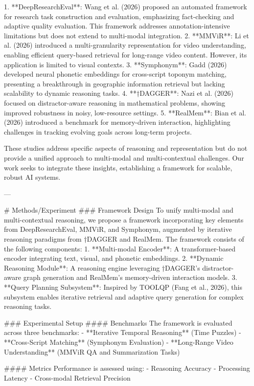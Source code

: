 1. **DeepResearchEval**: Wang et al. (2026) proposed an automated framework for research task construction and evaluation, emphasizing fact-checking and adaptive quality evaluation. This framework addresses annotation-intensive limitations but does not extend to multi-modal integration.  
2. **MMViR**: Li et al. (2026) introduced a multi-granularity representation for video understanding, enabling efficient query-based retrieval for long-range video content. However, its application is limited to visual contexts.  
3. **Symphonym**: Gadd (2026) developed neural phonetic embeddings for cross-script toponym matching, presenting a breakthrough in geographic information retrieval but lacking scalability to dynamic reasoning tasks.  
4. **†DAGGER**: Nazi et al. (2026) focused on distractor-aware reasoning in mathematical problems, showing improved robustness in noisy, low-resource settings.  
5. **RealMem**: Bian et al. (2026) introduced a benchmark for memory-driven interaction, highlighting challenges in tracking evolving goals across long-term projects.  

These studies address specific aspects of reasoning and representation but do not provide a unified approach to multi-modal and multi-contextual challenges. Our work seeks to integrate these insights, establishing a framework for scalable, robust AI systems.

---

# Methods/Experiment  
### Framework Design  
To unify multi-modal and multi-contextual reasoning, we propose a framework incorporating key elements from DeepResearchEval, MMViR, and Symphonym, augmented by iterative reasoning paradigms from †DAGGER and RealMem. The framework consists of the following components:  
1. **Multi-modal Encoder**: A transformer-based encoder integrating text, visual, and phonetic embeddings.  
2. **Dynamic Reasoning Module**: A reasoning engine leveraging †DAGGER’s distractor-aware graph generation and RealMem’s memory-driven interaction models.  
3. **Query Planning Subsystem**: Inspired by TOOLQP (Fang et al., 2026), this subsystem enables iterative retrieval and adaptive query generation for complex reasoning tasks.  

### Experimental Setup  
#### Benchmarks  
The framework is evaluated across three benchmarks:  
- **Iterative Temporal Reasoning** (Time Puzzles)  
- **Cross-Script Matching** (Symphonym Evaluation)  
- **Long-Range Video Understanding** (MMViR QA and Summarization Tasks)  

#### Metrics  
Performance is assessed using:  
- Reasoning Accuracy  
- Processing Latency  
- Cross-modal Retrieval Precision  

